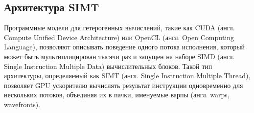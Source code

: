 \subsection{Архитектура SIMT}

Программные модели для гетерогенных вычислений, такие как CUDA (англ. Compute Unified Device Architecture)\cite{CUDA_Article} или OpenCL (англ. Open Computing Language), позволяют описывать поведение одного потока исполнения, который может быть мультиплицирован тысячи раз и запущен на наборе SIMD (англ. Single Instruction Multiple Data) вычислительных блоков. Такой тип архитектуры, определяемый как SIMT (англ. Single Instruction Multiple Thread), позволяет GPU ускорителю вычислять результат инструкции одновременно для нескольких потоков, объединяя их в пачки, именуемые варпы (англ. warps, wavefronts). 
